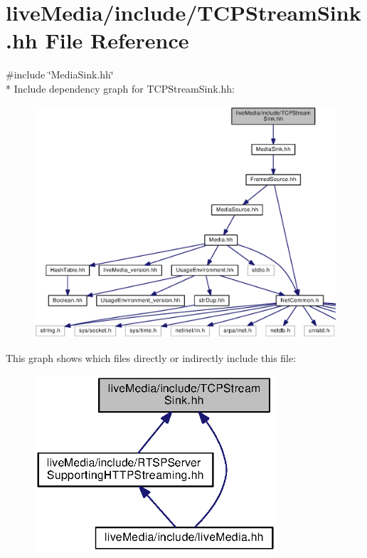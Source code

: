 \section{live\+Media/include/\+T\+C\+P\+Stream\+Sink.hh File Reference}
\label{TCPStreamSink_8hh}
{\ttfamily \#include \char`\"{}Media\+Sink.\+hh\char`\"{}}\\*
Include dependency graph for T\+C\+P\+Stream\+Sink.\+hh\+:
\nopagebreak
\begin{figure}[H]
\begin{center}
\leavevmode
\includegraphics[width=350pt]{TCPStreamSink_8hh__incl}
\end{center}
\end{figure}
This graph shows which files directly or indirectly include this file\+:
\nopagebreak
\begin{figure}[H]
\begin{center}
\leavevmode
\includegraphics[width=256pt]{TCPStreamSink_8hh__dep__incl}
\end{center}
\end{figure}
